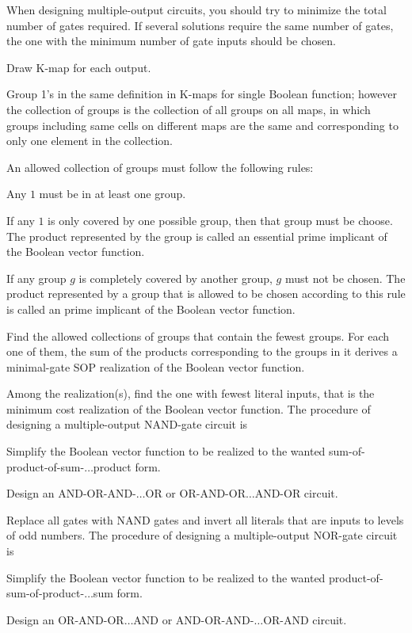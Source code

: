 \documentclass[a4paper,12pt]{report}
\begin{document}
When designing multiple-output circuits, you should try to minimize the total number of gates required. If several solutions require the same number of gates, the one with the minimum number of gate inputs should be chosen.
\ben
\item Draw K-map for each output.
\item Group 1's in the same definition in K-maps for single Boolean function; however the collection of groups is the collection of all groups on all maps, in which groups including same cells on different maps are the same and corresponding to only one element in the collection.
\item An allowed collection of groups must follow the following rules:
\bit
\item Any $1$ must be in at least one group.
\item If any $1$ is only covered by one possible group, then that group must be choose. The product represented by the group is called an essential prime implicant of the Boolean vector function.
\item If any group $g$ is completely covered by another group, $g$ must not be chosen. The product represented by a group that is allowed to be chosen according to this rule is called an prime implicant of the Boolean vector function.
\eit
\item Find the allowed collections of groups that contain the fewest groups. For each one of them, the sum of the products corresponding to the groups in it derives a minimal-gate SOP realization of the Boolean vector function.
\item Among the realization(s), find the one with fewest literal inputs, that is the minimum cost realization of the Boolean vector function.
\een
{}
The procedure of designing a multiple-output NAND-gate circuit is
\ben
\item Simplify the Boolean vector function to be realized to the wanted sum-of-product-of-sum-$\ldots$product form.
\item Design an AND-OR-AND-$\ldots$OR or OR-AND-OR$\ldots$AND-OR circuit.
\item Replace all gates with NAND gates and invert all literals that are inputs to levels of odd numbers.
\een
The procedure of designing a multiple-output NOR-gate circuit is
\ben
\item Simplify the Boolean vector function to be realized to the wanted product-of-sum-of-product-$\ldots$sum form.
\item Design an OR-AND-OR$\ldots$AND or AND-OR-AND-$\ldots$OR-AND circuit.
\end{document}
